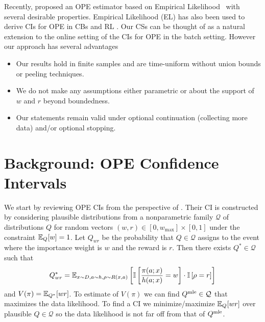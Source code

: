 Recently, \cite{kallus2019intrinsically} proposed an OPE estimator 
based on Empirical Likelihood~\cite{owen2001empirical} with several
desirable properties. Empirical Likelihood (EL) has also been used to 
derive CIs for OPE in CBs \cite{karampatziakis2019empirical} 
and RL \cite{dai2020coindice}. Our CSs can be thought of as a natural 
extension to the online setting of the CIs 
for OPE in the batch setting. However our approach 
has several advantages
\begin{itemize}
\item Our results hold in finite samples and are
time-uniform without union bounds or peeling techniques.
\item We do not make any assumptions either parametric 
or about the support of $w$ and $r$ beyond boundedness.
\item Our statements remain valid under optional 
continuation (collecting more data) and/or optional stopping.
\end{itemize}

\section{Background: OPE Confidence Intervals}
We start by reviewing OPE CIs from the perspective of \cite{karampatziakis2019empirical}. Their CI
is constructed by considering plausible distributions 
from a nonparametric family 
$\mathcal{Q}$ of distributions  $Q$
for random vectors $(w,r) \in [0,w_{\max}]\times [0,1]$ 
under the constraint $\mathbb{E}_Q[w]=1$. Let $Q_{wr}$ be 
the probability that $Q \in \mathcal{Q}$ assigns to the event
where the importance weight is $w$ and the
reward is $r$. Then there exists $Q^* \in \mathcal{Q}$ such that
\[
Q^*_{wr}=\mathbb{E}_{x\sim D,a\sim h,\rho\sim R(x,a)}
\left[
\mathbb{I}\left[\frac{\pi(a;x)}{h(a;x)}=w\right]\cdot
\mathbb{I}\left[\rho=r\right]
\right]
\]
and 
$
V(\pi)=\mathbb{E}_{Q^*}[wr]
$.
To estimate of $V(\pi)$ we can find 
$Q^{\textrm{mle}} \in \mathcal{Q}$ that maximizes
the data likelihood. To find a CI
we minimize/maximize $\mathbb{E}_Q[wr]$ over plausible 
$Q \in \mathcal{Q}$ so the data likelihood 
is not far off from that of $Q^{\textrm{mle}}$.

